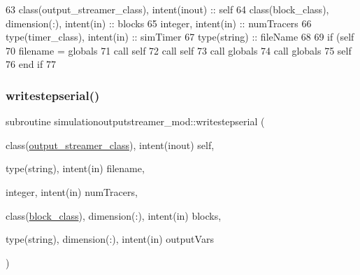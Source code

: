 \begin{DoxyCode}
63     \textcolor{keywordtype}{class}(output\_streamer\_class), \textcolor{keywordtype}{intent(inout)} :: self
64     \textcolor{keywordtype}{class}(block\_class), \textcolor{keywordtype}{dimension(:)}, \textcolor{keywordtype}{intent(in)} :: blocks
65     \textcolor{keywordtype}{integer}, \textcolor{keywordtype}{intent(in)} :: numTracers
66     \textcolor{keywordtype}{type}(timer\_class), \textcolor{keywordtype}{intent(in)} :: simTimer
67     \textcolor{keywordtype}{type}(string) :: fileName
68     
69     \textcolor{keywordflow}{if} (self%
70         filename = globals%
71         \textcolor{keyword}{call }self%
72         \textcolor{keyword}{call }self%
73         \textcolor{keyword}{call }globals%
74         \textcolor{keyword}{call }globals%
75         self%
76 \textcolor{keywordflow}{    end if}
77 
\end{DoxyCode}
\mbox{\label{namespacesimulationoutputstreamer__mod_a0382795016b75f3724cd7483857a4ec8}} 
\subsubsection{\texorpdfstring{writestepserial()}{writestepserial()}}
{\footnotesize\ttfamily subroutine simulationoutputstreamer\+\_\+mod\+::writestepserial (\begin{DoxyParamCaption}\item[{class(\mbox{\hyperlink{structsimulationoutputstreamer__mod_1_1output__streamer__class}{output\+\_\+streamer\+\_\+class}}), intent(inout)}]{self,  }\item[{type(string), intent(in)}]{filename,  }\item[{integer, intent(in)}]{num\+Tracers,  }\item[{class(\mbox{\hyperlink{structblocks__mod_1_1block__class}{block\+\_\+class}}), dimension(\+:), intent(in)}]{blocks,  }\item[{type(string), dimension(\+:), intent(in)}]{output\+Vars }\end{DoxyParamCaption})\hspace{0.3cm}{\ttfamily [private]}}



